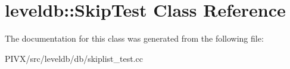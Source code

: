 \hypertarget{classleveldb_1_1_skip_test}{}\section{leveldb\+:\+:Skip\+Test Class Reference}
\label{classleveldb_1_1_skip_test}


The documentation for this class was generated from the following file\+:\begin{DoxyCompactItemize}
\item 
P\+I\+V\+X/src/leveldb/db/skiplist\+\_\+test.\+cc\end{DoxyCompactItemize}
